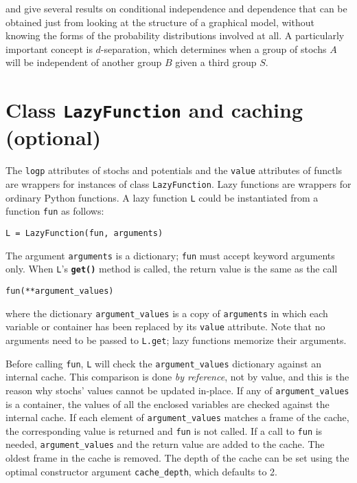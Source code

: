\cite{dawidmarkov} and \cite{jordangraphical} give several results on conditional independence and dependence that can be obtained just from looking at the structure of a graphical model, without knowing the forms of the probability distributions involved at all. A particularly important concept is $d$-separation, which determines when a group of stochs $A$ will be independent of another group $B$ given a third group $S$.

\section{Class \texttt{LazyFunction} and caching (optional)}

The \texttt{logp} attributes of stochs and potentials and the \texttt{value} attributes of functls are wrappers for instances of class \texttt{LazyFunction}. Lazy functions are wrappers for ordinary Python functions. A lazy function \texttt{L} could be instantiated from a function \texttt{fun} as follows:
\begin{verbatim}
L = LazyFunction(fun, arguments)
\end{verbatim}
The argument \texttt{arguments} is a dictionary; \texttt{fun} must accept keyword arguments only. When \texttt{L}'s \texttt{\bfseries get()} method is called, the return value is the same as the call 
\begin{verbatim}
fun(**argument_values)
\end{verbatim}
where the dictionary \texttt{argument\_values} is a copy of \texttt{arguments} in which each variable or container has been replaced by its \texttt{value} attribute. Note that no arguments need to be passed to \texttt{L.get}; lazy functions memorize their arguments.

Before calling \texttt{fun}, \texttt{L} will check the \texttt{argument\_values} dictionary against an internal cache. This comparison is done \emph{by reference}, not by value, and this is the reason why stochs' values cannot be updated in-place. If any of \texttt{argument\_values} is a container, the values of all the enclosed variables are checked against the internal cache. If each element of \texttt{argument\_values} matches a frame of the cache, the corresponding value is returned and \texttt{fun} is not called. If a call to \texttt{fun} is needed, \texttt{argument\_values} and the return value are added to the cache. The oldest frame in the cache is removed. The depth of the cache can be set using the optimal constructor argument \texttt{cache\_depth}, which defaults to 2.

